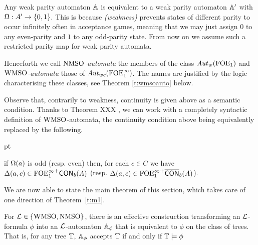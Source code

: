 \begin{remark}
Any weak parity automaton $\mathbb{A}$ is equivalent to a weak parity automaton
$\mathbb{A}'$ with $\Omega: A' \to \{0,1\}$. This is because \emph{(weakness)} prevents states of different parity to occur infinitely often in acceptance games, meaning that we may just assign $0$ to any even-parity and $1$ to any odd-parity state. From now on we assume such a restricted parity map for weak parity automata.
\end{remark}

Henceforth we call \emph{$\mathrm{NMSO}$-automata} the members of the class $\mathit{Aut}_{w}(\mathrm{FOE}_1)$ and \emph{$\mathrm{WMSO}$-automata} those of $\mathit{Aut}_{wc}(\mathrm{FOE}^{\infty}_1)$. The names are justified by the logic characterising these classes, see Theorem \ref{t:wmsoauto} below.

\begin{remark}
Observe that, contrarily to weakness, continuity is given above as a semantic condition. Thanks to Theorem XXX , we can work with a completely syntactic definition of $\mathrm{WMSO}$-automata, the continuity condition above being equivalently replaced by the following. 
\begin{description}
	 pt
	\item[(continuity, syntactically)] if $\Omega(a)$ is odd (resp. even) then, for each $c\in C$ we have
	   $\Delta(a,c) \in {\ensuremath{\mathrm{FOE}^{\infty}_1}}^+\mathsf{CON}_{b}(A)$ (resp. $\Delta(a,c) \in {\ensuremath{\mathrm{FOE}^{\infty}_1}}^+\overline{\mathsf{CON}}_{b}(A)$).
\end{description} 
\end{remark}

We are now able to state the main theorem of this section, which takes care of
one direction of Theorem~\ref{t:m1}. 

\begin{theorem}
\label{t:wmsoauto}
For $\mathcal{L} \in \{ \mathrm{WMSO}, \mathrm{NMSO}\}$, there is an effective construction transforming an $\mathcal{L}$-formula $\phi$
into an $\mathcal{L}$-automaton $\mathbb{A}_{\phi}$ that is equivalent
to $\phi$ on the class of trees.
That is, for any tree $\mathbb{T}$, $\mathbb{A}_{\phi}$ accepts $\mathbb{T}$ if and only if $\mathbb{T} \models {\phi}$
\end{theorem}

